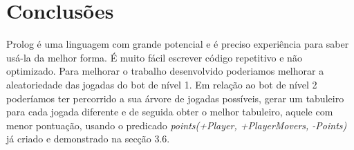 \documentclass[a4paper]{article}
\begin{document}
\section{Conclusões}
Prolog é uma linguagem com grande potencial e é preciso experiência para saber usá-la da melhor forma. É muito fácil escrever código repetitivo e não optimizado.
Para melhorar o trabalho desenvolvido poderiamos melhorar a aleatoriedade das jogadas do bot de nível 1. Em relação ao bot de nível 2 poderíamos ter percorrido a sua árvore de jogadas possíveis, gerar um tabuleiro para cada jogada diferente e de seguida obter o melhor tabuleiro, aquele com menor pontuação, usando o predicado \textit{points(+Player, +PlayerMovers, -Points)}  já criado e demonstrado na secção 3.6.


\clearpage
{}
\renewcommand\refname{Bibliografia}


\end{document}
